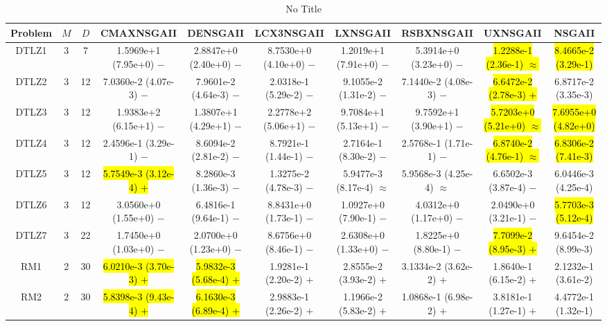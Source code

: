 \documentclass[journal]{IEEEtran}
\begin{document}
\begin{table*}[htbp]
\renewcommand{\arraystretch}{1.2}
\centering
\caption{No Title}
\begin{tabular}{cccccccccc}
\toprule
Problem&$M$&$D$&CMAXNSGAII&DENSGAII&LCX3NSGAII&LXNSGAII&RSBXNSGAII&UXNSGAII&NSGAII\\
\midrule
\multirow{1}{*}{DTLZ1}&3&7&1.5969e+1 (7.95e+0) $-$&2.8847e+0 (2.40e+0) $-$&8.7530e+0 (4.10e+0) $-$&1.2019e+1 (7.91e+0) $-$&5.3914e+0 (3.23e+0) $-$&\hl{1.2288e-1 (2.36e-1) $\approx$}&\hl{8.4665e-2 (3.29e-1)}\\
\hline
\multirow{1}{*}{DTLZ2}&3&12&7.0360e-2 (4.07e-3) $-$&7.9601e-2 (4.64e-3) $-$&2.0318e-1 (5.29e-2) $-$&9.1055e-2 (1.31e-2) $-$&7.1440e-2 (4.08e-3) $-$&\hl{6.6472e-2 (2.78e-3) $+$}&6.8717e-2 (3.35e-3)\\
\hline
\multirow{1}{*}{DTLZ3}&3&12&1.9383e+2 (6.15e+1) $-$&1.3807e+1 (4.29e+1) $-$&2.2778e+2 (5.06e+1) $-$&9.7084e+1 (5.13e+1) $-$&9.7592e+1 (3.90e+1) $-$&\hl{5.7203e+0 (5.21e+0) $\approx$}&\hl{7.6955e+0 (4.82e+0)}\\
\hline
\multirow{1}{*}{DTLZ4}&3&12&2.4596e-1 (3.29e-1) $-$&8.6094e-2 (2.81e-2) $-$&8.7921e-1 (1.44e-1) $-$&2.7164e-1 (8.30e-2) $-$&2.5768e-1 (1.71e-1) $-$&\hl{6.8740e-2 (4.76e-1) $\approx$}&\hl{6.8306e-2 (7.41e-3)}\\
\hline
\multirow{1}{*}{DTLZ5}&3&12&\hl{5.7549e-3 (3.12e-4) $+$}&8.2860e-3 (1.36e-3) $-$&1.3275e-2 (4.78e-3) $-$&5.9477e-3 (8.17e-4) $\approx$&5.9568e-3 (4.25e-4) $\approx$&6.6502e-3 (3.87e-4) $-$&6.0446e-3 (4.25e-4)\\
\hline
\multirow{1}{*}{DTLZ6}&3&12&3.0560e+0 (1.55e+0) $-$&6.4816e-1 (9.64e-1) $-$&8.8431e+0 (1.73e-1) $-$&1.0927e+0 (7.90e-1) $-$&4.0312e+0 (1.17e+0) $-$&2.0490e+0 (3.21e-1) $-$&\hl{5.7703e-3 (5.12e-4)}\\
\hline
\multirow{1}{*}{DTLZ7}&3&22&1.7450e+0 (1.03e+0) $-$&2.0700e+0 (1.23e+0) $-$&8.6756e+0 (8.46e-1) $-$&2.6308e+0 (1.33e+0) $-$&1.8225e+0 (8.80e-1) $-$&\hl{7.7099e-2 (8.95e-3) $+$}&9.6454e-2 (8.99e-3)\\
\hline
\multirow{1}{*}{RM1}&2&30&\hl{6.0210e-3 (3.70e-3) $+$}&\hl{5.9832e-3 (5.68e-4) $+$}&1.9281e-1 (2.20e-2) $+$&2.8555e-2 (3.93e-2) $+$&3.1334e-2 (3.62e-2) $+$&1.8640e-1 (6.15e-2) $+$&2.1232e-1 (3.61e-2)\\
\hline
\multirow{1}{*}{RM2}&2&30&\hl{5.8398e-3 (9.43e-4) $+$}&\hl{6.1630e-3 (6.89e-4) $+$}&2.9883e-1 (2.26e-2) $+$&1.1966e-2 (5.83e-2) $+$&1.0868e-1 (6.98e-2) $+$&3.8181e-1 (1.27e-1) $+$&4.4772e-1 (1.32e-1)\\
\hline

\end{tabular}
\end{table*}
\end{document}
